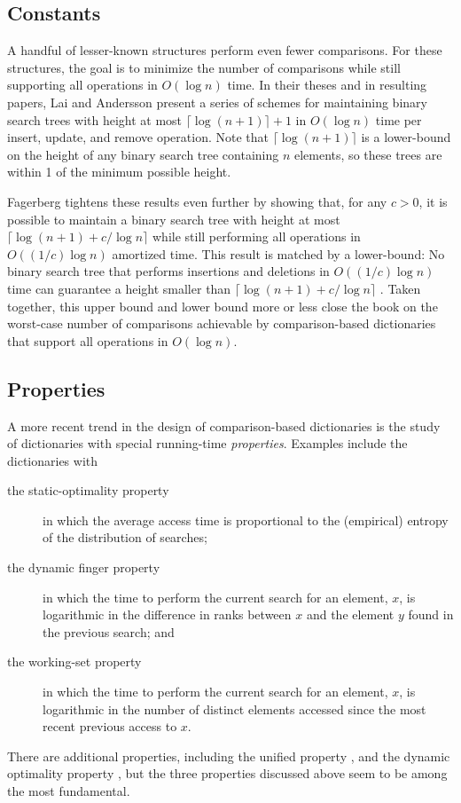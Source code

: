 \documentclass{patmorin}
\begin{document}
\subsection{Constants}

A handful of lesser-known structures perform even fewer comparisons.
For these structures, the goal is to minimize the number of comparisons
while still supporting all operations in $O(\log n)$ time.  In their
theses \cite{X,Y} and in resulting papers, Lai and Andersson \cite{X,Y,Z}
present a series of schemes for maintaining binary search trees with
height at most $\lceil\log(n+1)\rceil+1$ in $O(\log n)$ time per insert,
update, and remove operation.  Note that $\lceil\log(n+1)\rceil$ is
a lower-bound on the height of any binary search tree containing $n$
elements, so these trees are within 1 of the minimum possible height.

Fagerberg \cite{fagerberg:complexity} tightens these results even
further by showing that, for any $c>0$, it is possible to maintain
a binary search tree with height at most $\lceil\log(n+1)+c/\log
n\rceil$ while still performing all operations in $O((1/c)\log n)$
amortized time.  This result is matched by a lower-bound: No binary
search tree that performs insertions and deletions in $O((1/c)\log n)$
time can guarantee a height smaller than $\lceil\log(n+1)+c/\log n\rceil$
\cite{fagerberg:binary-how-low-can-you-go}.  Taken together, this upper
bound and lower bound more or less close the book on the worst-case
number of comparisons achievable by comparison-based dictionaries that
support all operations in $O(\log n)$.

\subsection{Properties}

A more recent trend in the design of comparison-based dictionaries
is the study of dictionaries with special running-time \emph{properties}.
Examples include the dictionaries with 
\begin{description}
\item[the static-optimality property] in which the average access time is
   proportional to the (empirical) entropy of the distribution of
   searches;

\item[the dynamic finger property] in which the time to perform the current
   search for an element, $x$, is logarithmic in the difference in ranks between
   $x$ and the element $y$ found in the previous search; and

\item[the working-set property] in which the time to perform the current
   search for an element, $x$, is logarithmic in the number of distinct
   elements accessed since the most recent previous access to $x$.
\end{description}
There are additional properties, including the unified property
\cite{IXX}, and the dynamic optimality property \cite{X}, but the three
properties discussed above seem to be among the most fundamental.
\end{document}
